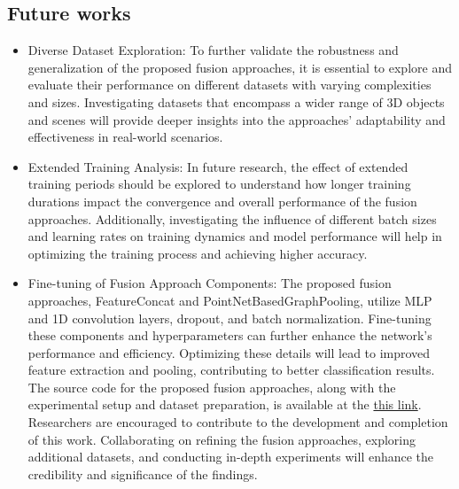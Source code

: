 \documentclass[conference]{IEEEtran}
\begin{document}
\subsection{Future works}
\begin{itemize}
\item 	Diverse Dataset Exploration: To further validate the robustness and generalization of the proposed fusion approaches, it is essential to explore and evaluate their performance on different datasets with varying complexities and sizes. Investigating datasets that encompass a wider range of 3D objects and scenes will provide deeper insights into the approaches' adaptability and effectiveness in real-world scenarios.

\item 	Extended Training Analysis: In future research, the effect of extended training periods should be explored to understand how longer training durations impact the convergence and overall performance of the fusion approaches. Additionally, investigating the influence of different batch sizes and learning rates on training dynamics and model performance will help in optimizing the training process and achieving higher accuracy.


\item 	Fine-tuning of Fusion Approach Components: The proposed fusion approaches, FeatureConcat and PointNetBasedGraphPooling, utilize MLP and 1D convolution layers, dropout, and batch normalization. Fine-tuning these components and hyperparameters can further enhance the network's performance and efficiency. Optimizing these details will lead to improved feature extraction and pooling, contributing to better classification results.
The source code for the proposed fusion approaches, along with the experimental setup and dataset preparation, is available at the \href{https://github.com/MohsenEbadpour/PointNet-meets-Self-Attention-Graph-Pooling-A-Synergistic-Approach-to-Point-Cloud-Classification}{this link}. Researchers are encouraged to contribute to the development and completion of this work. Collaborating on refining the fusion approaches, exploring additional datasets, and conducting in-depth experiments will enhance the credibility and significance of the findings.

\end{itemize}







\end{document}
